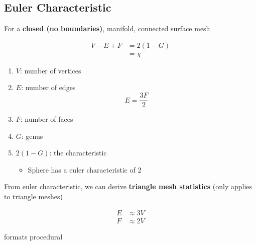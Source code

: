   \subsection{Euler Characteristic}

    For a \textbf{closed (no boundaries)}, manifold, connected surface mesh

    \begin{align}
      V - E + F &= 2 \left( 1 - G \right) \\
      &= \chi
    \end{align}

    \begin{enumerate}
      \item $ V $: number of vertices
      \item $ E $: number of edges
      \begin{equation}
        E = \frac{3F}{2}
      \end{equation}

      \item $ F $: number of faces
      \item $ G $: genus
      \item $ 2 \left( 1 - G \right) $: the characteristic
      \begin{itemize}
        \item Sphere has a euler characteristic of $ 2 $
      \end{itemize}
    \end{enumerate}

    From euler characteristic, we can derive \textbf{triangle mesh statistics}
    (only applies to triangle meshes)

    \begin{align}
      E &\approx 3V \\
      F &\approx 2V
    \end{align}

{formats}
{procedural}
